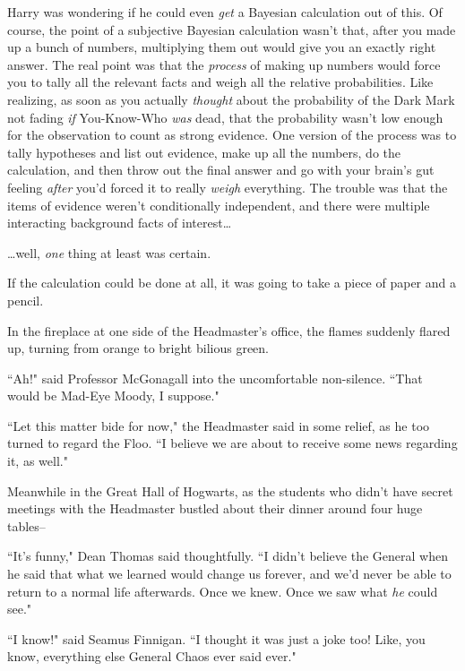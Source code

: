 Harry was wondering if he could even \emph{get} a Bayesian calculation out of this. Of course, the point of a subjective Bayesian calculation wasn't that, after you made up a bunch of numbers, multiplying them out would give you an exactly right answer. The real point was that the \emph{process} of making up numbers would force you to tally all the relevant facts and weigh all the relative probabilities. Like realizing, as soon as you actually \emph{thought} about the probability of the Dark Mark not fading \emph{if} You-Know-Who \emph{was} dead, that the probability wasn't low enough for the observation to count as strong evidence. One version of the process was to tally hypotheses and list out evidence, make up all the numbers, do the calculation, and then throw out the final answer and go with your brain's gut feeling \emph{after} you'd forced it to really \emph{weigh} everything. The trouble was that the items of evidence weren't conditionally independent, and there were multiple interacting background facts of interest{\ldots}

{\ldots}well, \emph{one} thing at least was certain.

If the calculation could be done at all, it was going to take a piece of paper and a pencil.

In the fireplace at one side of the Headmaster's office, the flames suddenly flared up, turning from orange to bright bilious green.

``Ah!" said Professor McGonagall into the uncomfortable non-silence. ``That would be Mad-Eye Moody, I suppose."

``Let this matter bide for now," the Headmaster said in some relief, as he too turned to regard the Floo. ``I believe we are about to receive some news regarding it, as well."


Meanwhile in the Great Hall of Hogwarts, as the students who didn't have secret meetings with the Headmaster bustled about their dinner around four huge tables\---

``It's funny," Dean Thomas said thoughtfully. ``I didn't believe the General when he said that what we learned would change us forever, and we'd never be able to return to a normal life afterwards. Once we knew. Once we saw what \emph{he} could see."

``I know!" said Seamus Finnigan. ``I thought it was just a joke too! Like, you know, everything else General Chaos ever said ever."

